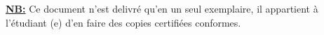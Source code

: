 \vfill \scriptsize\textbf{\underline{NB:}} Ce document n'est delivré qu'en un seul exemplaire, il appartient à l'étudiant (e) d'en faire des copies certifiées conformes.\vspace{1.5cm}
